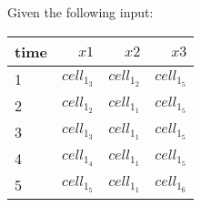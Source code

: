 
Given the following input:
\begin{table}[ht!]
\begin{center}
\begin{tabular}{|l|r|r|r|}
\hline
time & $\mathit{x}1$& $\mathit{x}2$& $\mathit{x}3$\\
\hline
1 & $\mathit{cell}_1_3$& $\mathit{cell}_1_2$& $\mathit{cell}_1_5$ \\
2 & $\mathit{cell}_1_2$& $\mathit{cell}_1_1$& $\mathit{cell}_1_5$ \\
3 & $\mathit{cell}_1_3$& $\mathit{cell}_1_1$& $\mathit{cell}_1_5$ \\
4 & $\mathit{cell}_1_4$& $\mathit{cell}_1_1$& $\mathit{cell}_1_5$ \\
5 & $\mathit{cell}_1_5$& $\mathit{cell}_1_1$& $\mathit{cell}_1_6$ \\
\hline
\end{tabular}
\end{center}
\end{table}

